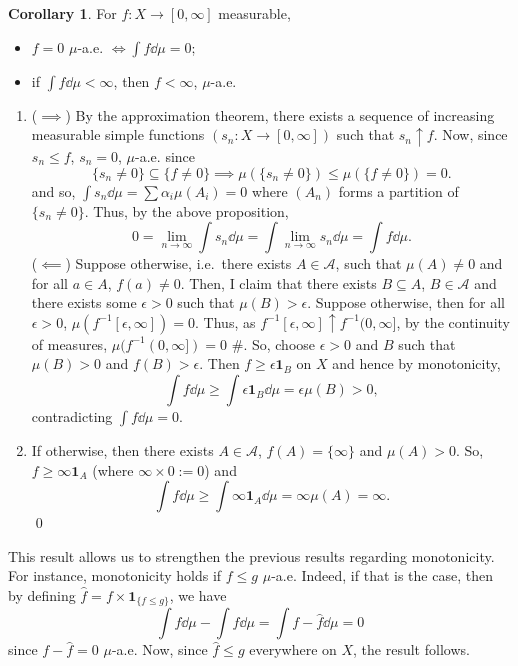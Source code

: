 \documentclass[
]{article}
\theoremstyle{definition}
\newtheorem{corollary}{Corollary}[theorem]
\theoremstyle{definition}
\begin{document}
\begin{corollary}
  For \(f : X \to [0, \infty]\) measurable,
  \begin{itemize}
    \item \(f = 0\) \(\mu\)-a.e. \(\iff \int f \dd \mu = 0\);
    \item if \(\int f \dd \mu < \infty\), then \(f < \infty\), \(\mu\)-a.e.
  \end{itemize}
\end{corollary}
\proof \hspace{1mm}

\begin{enumerate}
\def\labelenumi{(\arabic{enumi})}
\item
  (\(\implies\)) By the approximation theorem, there exists a sequence
  of increasing measurable simple functions
  \((s_n : X \to [0, \infty])\) such that \(s_n \uparrow f\). Now, since
  \(s_n \le f\), \(s_n = 0\), \(\mu\)-a.e. since
  \[\{s_n \neq 0\} \subseteq \{f \neq 0\} \implies \mu(\{s_n \neq 0\}) 
      \le \mu(\{f \neq 0\}) = 0.\] and so,
  \(\int s_n \dd \mu = \sum \alpha_i \mu(A_i) = 0\) where \((A_n)\)
  forms a partition of \(\{s_n \neq 0\}\). Thus, by the above
  proposition,
  \[0 = \lim_{n \to \infty} \int s_n \dd \mu = \int \lim_{n \to \infty} s_n \dd \mu = 
      \int f \dd \mu.\] (\(\impliedby\)) Suppose otherwise, i.e.~there
  exists \(A \in \mathcal{A}\), such that \(\mu(A) \neq 0\) and for all
  \(a \in A\), \(f(a) \neq 0\). Then, I claim that there exists
  \(B \subseteq A\), \(B \in \mathcal{A}\) and there exists some
  \(\epsilon > 0\) such that \(\mu(B) > \epsilon\). Suppose otherwise,
  then for all \(\epsilon > 0\), \(\mu(f^{-1}[\epsilon, \infty]) = 0\).
  Thus, as \(f^{-1}[\epsilon, \infty] \uparrow f^{-1}(0, \infty]\), by
  the continuity of measures, \(\mu(f^{-1}(0, \infty]) = 0\) \#. So,
  choose \(\epsilon >0\) and \(B\) such that \(\mu(B) > 0\) and
  \(f(B) > \epsilon\). Then \(f \ge \epsilon\mathbf{1}_B\) on \(X\) and
  hence by monotonicity,
  \[\int f \dd \mu \ge \int \epsilon\mathbf{1}_B \dd \mu = \epsilon \mu(B) > 0,\]
  contradicting \(\int f \dd \mu = 0\).
\item
  If otherwise, then there exists \(A \in \mathcal{A}\),
  \(f(A) = \{\infty\}\) and \(\mu(A) > 0\). So,
  \(f \ge \infty \mathbf{1}_A\) (where \(\infty \times 0 := 0\)) and
  \[\int f \dd \mu \ge \int \infty \mathbf{1}_A \dd \mu = \infty \mu(A) = \infty.\]
  \qed
\end{enumerate}

This result allows us to strengthen the previous results regarding
monotonicity. For instance, monotonicity holds if \(f \le g\)
\(\mu\)-a.e. Indeed, if that is the case, then by defining
\(\hat f = f \times \mathbf{1}_{\{f \le g\}}\), we have
\[\int f \dd \mu - \int \hat f \dd \mu = \int f - \hat f \dd \mu = 0\]
since \(f - \hat f = 0\) \(\mu\)-a.e. Now, since \(\hat f \le g\)
everywhere on \(X\), the result follows.
\end{document}

